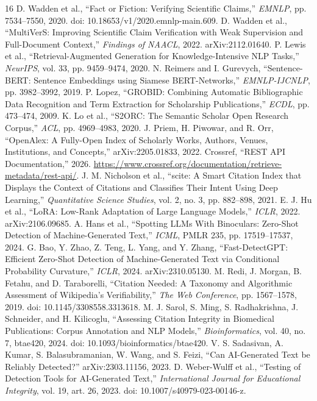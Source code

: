 \documentclass[12pt,toc=bib,toc=listof]{scrartcl}
\begin{document}
\label{mainend}
\clearpage
\begin{thebibliography}{16}
\small
{} D. Wadden et al., ``Fact or Fiction: Verifying Scientific Claims,'' \emph{EMNLP}, pp. 7534--7550, 2020. doi: 10.18653/v1/2020.emnlp-main.609.
 D. Wadden et al., ``MultiVerS: Improving Scientific Claim Verification with Weak Supervision and Full-Document Context,'' \emph{Findings of NAACL}, 2022. arXiv:2112.01640.
 P. Lewis et al., ``Retrieval-Augmented Generation for Knowledge-Intensive NLP Tasks,'' \emph{NeurIPS}, vol. 33, pp. 9459--9474, 2020.
 N. Reimers and I. Gurevych, ``Sentence-BERT: Sentence Embeddings using Siamese BERT-Networks,'' \emph{EMNLP-IJCNLP}, pp. 3982--3992, 2019.
 P. Lopez, ``GROBID: Combining Automatic Bibliographic Data Recognition and Term Extraction for Scholarship Publications,'' \emph{ECDL}, pp. 473--474, 2009.
 K. Lo et al., ``S2ORC: The Semantic Scholar Open Research Corpus,'' \emph{ACL}, pp. 4969--4983, 2020.
 J. Priem, H. Piwowar, and R. Orr, ``OpenAlex: A Fully-Open Index of Scholarly Works, Authors, Venues, Institutions, and Concepts,'' arXiv:2205.01833, 2022.
 Crossref, ``REST API Documentation,'' 2026. \url{https://www.crossref.org/documentation/retrieve-metadata/rest-api/}.
 J. M. Nicholson et al., ``scite: A Smart Citation Index that Displays the Context of Citations and Classifies Their Intent Using Deep Learning,'' \emph{Quantitative Science Studies}, vol. 2, no. 3, pp. 882--898, 2021.
 E. J. Hu et al., ``LoRA: Low-Rank Adaptation of Large Language Models,'' \emph{ICLR}, 2022. arXiv:2106.09685.
 A. Hans et al., ``Spotting LLMs With Binoculars: Zero-Shot Detection of Machine-Generated Text,'' \emph{ICML}, PMLR 235, pp. 17519--17537, 2024.
 G. Bao, Y. Zhao, Z. Teng, L. Yang, and Y. Zhang, ``Fast-DetectGPT: Efficient Zero-Shot Detection of Machine-Generated Text via Conditional Probability Curvature,'' \emph{ICLR}, 2024. arXiv:2310.05130.
 M. Redi, J. Morgan, B. Fetahu, and D. Taraborelli, ``Citation Needed: A Taxonomy and Algorithmic Assessment of Wikipedia's Verifiability,'' \emph{The Web Conference}, pp. 1567--1578, 2019. doi: 10.1145/3308558.3313618.
 M. J. Sarol, S. Ming, S. Radhakrishna, J. Schneider, and H. Kilicoglu, ``Assessing Citation Integrity in Biomedical Publications: Corpus Annotation and NLP Models,'' \emph{Bioinformatics}, vol. 40, no. 7, btae420, 2024. doi: 10.1093/bioinformatics/btae420.
 V. S. Sadasivan, A. Kumar, S. Balasubramanian, W. Wang, and S. Feizi, ``Can AI-Generated Text be Reliably Detected?'' arXiv:2303.11156, 2023.
 D. Weber-Wulff et al., ``Testing of Detection Tools for AI-Generated Text,'' \emph{International Journal for Educational Integrity}, vol. 19, art. 26, 2023. doi: 10.1007/s40979-023-00146-z.
\end{thebibliography}
\end{document}
